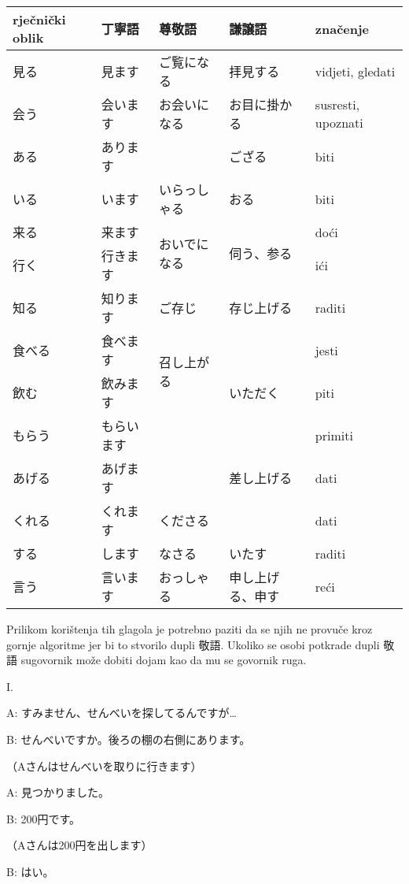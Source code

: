 	\begin{table}[h]
		\centering
		\begin{tabular}{l l l l l}\toprule[2pt]
			rječnički oblik & 丁寧語 & 尊敬語 & 謙譲語　& značenje\\
			\midrule
			見る & 見ます & ご覧になる & 拝見する & vidjeti, gledati\\
			会う & 会います & お会いになる & お目に掛かる & susresti, upoznati \\
			ある & あります & & ござる & biti\\
			いる & います & いらっしゃる & おる & biti\\
			来る & 来ます & \multirow{2}{100pt}{おいでになる} & \multirow{2}{100pt}{伺う、参る} & doći\\
			行く & 行きます &  & & ići\\
			知る & 知ります & ご存じ & 存じ上げる & raditi\\
			食べる　& 食べます & \multirow{2}{100pt}{召し上がる} & \multirow{3}{100pt}{いただく} & jesti\\
			飲む　& 飲みます & & & piti\\
			もらう & もらいます & & & primiti\\
			あげる　& あげます & & 差し上げる & dati\\
			くれる　& くれます & くださる & & dati\\
			する　& します & なさる & いたす & raditi\\
			言う & 言います & おっしゃる　& 申し上げる、申す & reći\\
			\bottomrule[2pt]
		\end{tabular}
	\end{table}
	
	Prilikom korištenja tih glagola je potrebno paziti da se njih ne provuče kroz gornje algoritme jer bi to stvorilo dupli 敬語. Ukoliko se osobi potkrade dupli 敬語 sugovornik može dobiti dojam kao da mu se govornik ruga.
	\newpage
	
	I.
	
	A: すみません、せんべいを探してるんですが…
	
	B: せんべいですか。後ろの棚の右側にあります。
	
	（Aさんはせんべいを取りに行きます）
	
	A: 見つかりました。	
	
	B: 200円です。
	
	（Aさんは200円を出します）
	
	B: はい。

